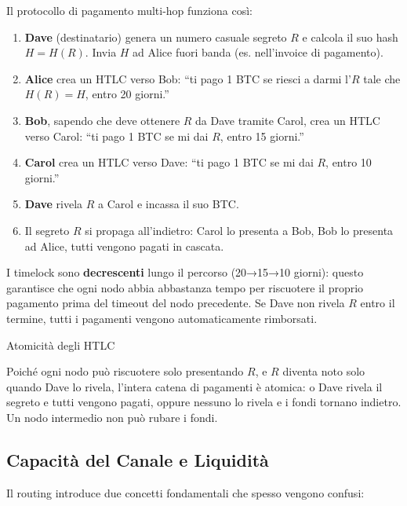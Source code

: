 \documentclass[
  italian,
  openany]{book}
\providecommand{\tightlist}{%
  \setlength{\itemsep}{0pt}\setlength{\parskip}{0pt}}
\begin{document}
Il protocollo di pagamento multi-hop funziona così:

\begin{enumerate}
\def\labelenumi{\arabic{enumi}.}
\tightlist
\item
  \textbf{Dave} (destinatario) genera un numero casuale segreto \(R\) e
  calcola il suo hash \(H = H(R)\). Invia \(H\) ad Alice fuori banda
  (es. nell'invoice di pagamento).
\item
  \textbf{Alice} crea un HTLC verso Bob: ``ti pago 1 BTC se riesci a
  darmi l'\(R\) tale che \(H(R) = H\), entro 20 giorni.''
\item
  \textbf{Bob}, sapendo che deve ottenere \(R\) da Dave tramite Carol,
  crea un HTLC verso Carol: ``ti pago 1 BTC se mi dai \(R\), entro 15
  giorni.''
\item
  \textbf{Carol} crea un HTLC verso Dave: ``ti pago 1 BTC se mi dai
  \(R\), entro 10 giorni.''
\item
  \textbf{Dave} rivela \(R\) a Carol e incassa il suo BTC.
\item
  Il segreto \(R\) si propaga all'indietro: Carol lo presenta a Bob, Bob
  lo presenta ad Alice, tutti vengono pagati in cascata.
\end{enumerate}

I timelock sono \textbf{decrescenti} lungo il percorso (20→15→10
giorni): questo garantisce che ogni nodo abbia abbastanza tempo per
riscuotere il proprio pagamento prima del timeout del nodo precedente.
Se Dave non rivela \(R\) entro il termine, tutti i pagamenti vengono
automaticamente rimborsati.

\begin{callouttip}{Atomicità degli HTLC}

Poiché ogni nodo può riscuotere solo presentando \(R\), e \(R\) diventa
noto solo quando Dave lo rivela, l'intera catena di pagamenti è atomica:
o Dave rivela il segreto e tutti vengono pagati, oppure nessuno lo
rivela e i fondi tornano indietro. Un nodo intermedio non può rubare i
fondi.

\end{callouttip}

\subsection{Capacità del Canale e
Liquidità}\label{capacituxe0-del-canale-e-liquidituxe0}

Il routing introduce due concetti fondamentali che spesso vengono
confusi:
\end{document}
